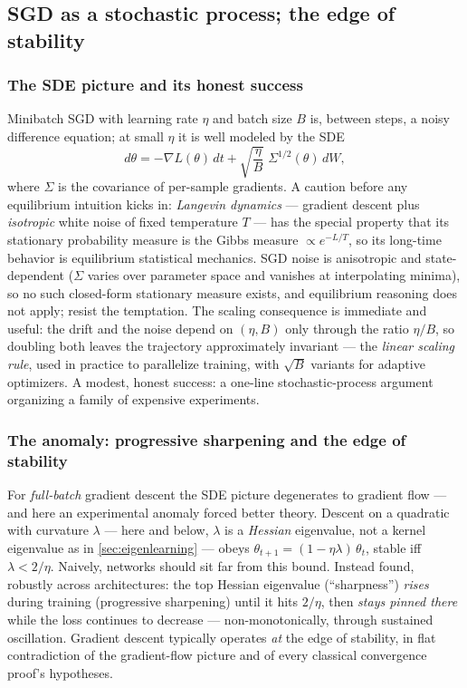 \documentclass[11pt]{article}
\begin{document}
\subsection{SGD as a stochastic process; the edge of stability}
\label{sec:sgd}

\subsubsection{The SDE picture and its honest success}

Minibatch SGD with learning rate $\eta$ and batch size $B$ is, between
steps, a noisy difference equation; at small $\eta$ it is well modeled by
the SDE
\begin{equation}
  d\theta = -\nabla L(\theta)\, dt
  + \sqrt{\frac{\eta}{B}}\; \Sigma^{1/2}(\theta)\, dW,
\end{equation}
where $\Sigma$ is the covariance of per-sample gradients. A caution before
any equilibrium intuition kicks in: \emph{Langevin dynamics} --- gradient
descent plus \emph{isotropic} white noise of fixed temperature $T$ --- has
the special property that its stationary probability measure is the Gibbs
measure $\propto e^{-L/T}$, so its long-time behavior is equilibrium
statistical mechanics. SGD noise is anisotropic and state-dependent
($\Sigma$ varies over parameter space and vanishes at interpolating
minima), so no such closed-form stationary measure exists, and equilibrium
reasoning does not apply; resist the temptation. The scaling consequence is
immediate and useful: the drift and the noise depend on $(\eta, B)$ only
through the ratio $\eta/B$, so doubling both leaves the trajectory
approximately invariant --- the \emph{linear scaling rule}, used in practice
to parallelize training, with $\sqrt{B}$ variants for adaptive optimizers.
A modest, honest success: a one-line stochastic-process argument organizing
a family of expensive experiments.

\subsubsection{The anomaly: progressive sharpening and the edge of stability}

For \emph{full-batch} gradient descent the SDE picture degenerates to
gradient flow --- and here an experimental anomaly forced better theory.
Descent on a quadratic with curvature $\lambda$ --- here and below,
$\lambda$ is a \emph{Hessian} eigenvalue, not a kernel eigenvalue as in
\cref{sec:eigenlearning} --- obeys
$\theta_{t+1} = (1 - \eta\lambda)\,\theta_t$, stable iff
$\lambda < 2/\eta$. Naively, networks should sit far from this bound.
Instead \cite{cohen2021gradient} found, robustly across architectures:
the top Hessian eigenvalue (``sharpness'') \emph{rises} during training
(progressive sharpening) until it hits $2/\eta$, then \emph{stays pinned
there} while the loss continues to decrease --- non-monotonically, through
sustained oscillation. Gradient descent typically operates \emph{at} the
edge of stability, in flat contradiction of the gradient-flow picture and
of every classical convergence proof's hypotheses.
\end{document}
